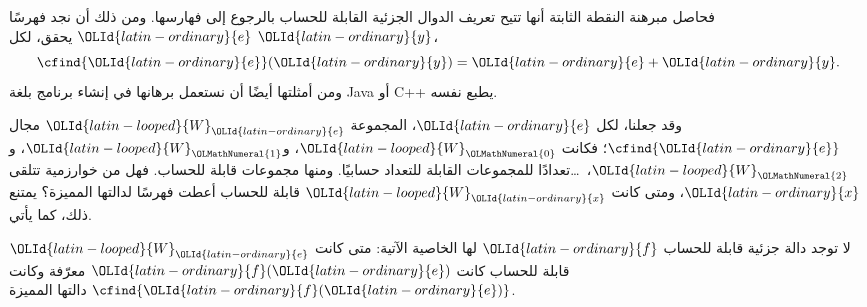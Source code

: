 \documentclass[../../../include/open-logic-section]{subfiles}
\begin{document}

فحاصل مبرهنة النقطة الثابتة أنها تتيح تعريف الدوال الجزئية القابلة
للحساب بالرجوع إلى فهارسها. ومن ذلك أن نجد فهرسًا $\OLId{latin-ordinary}{e}$ يحقق، لكل $\OLId{latin-ordinary}{y}$،
\[
\cfind{\OLId{latin-ordinary}{e}}(\OLId{latin-ordinary}{y}) = \OLId{latin-ordinary}{e} + \OLId{latin-ordinary}{y}.
\]
ومن أمثلتها أيضًا أن نستعمل برهانها في إنشاء برنامج
بلغة Java أو C++ يطبع نفسه.

وقد جعلنا، لكل $\OLId{latin-ordinary}{e}$، المجموعة $\OLId{latin-looped}{W}_\OLId{latin-ordinary}{e}$ مجال $\cfind{\OLId{latin-ordinary}{e}}$؛
فكانت $\OLId{latin-looped}{W}_\OLMathNumeral{0}$، و$\OLId{latin-looped}{W}_\OLMathNumeral{1}$، و$\OLId{latin-looped}{W}_\OLMathNumeral{2}$،~\dots تعدادًا للمجموعات القابلة للتعداد
حسابيًا. ومنها مجموعات قابلة للحساب. فهل من خوارزمية
تتلقى $\OLId{latin-ordinary}{x}$، ومتى كانت $\OLId{latin-looped}{W}_\OLId{latin-ordinary}{x}$ قابلة للحساب أعطت فهرسًا
لدالتها المميزة؟ يمتنع ذلك، كما يأتي.

\begin{thm}
لا توجد دالة جزئية قابلة للحساب $\OLId{latin-ordinary}{f}$ لها الخاصية الآتية: متى كانت
$\OLId{latin-looped}{W}_\OLId{latin-ordinary}{e}$ قابلة للحساب كانت $\OLId{latin-ordinary}{f}(\OLId{latin-ordinary}{e})$ معرّفة وكانت $\cfind{\OLId{latin-ordinary}{f}(\OLId{latin-ordinary}{e})}$ دالتها
المميزة.
\end{thm}
\end{document}
